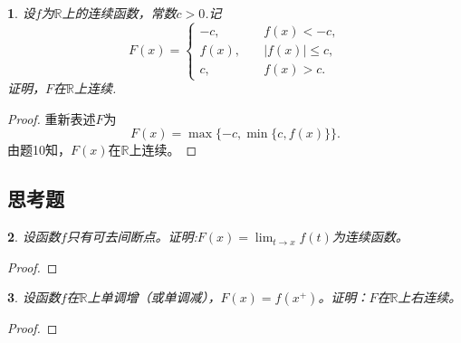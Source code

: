 \documentclass[utf8]{book}
\newtheorem{example}{}[section]             %
\begin{document}
\begin{example}
设$f$为$\mathbb{R}$上的连续函数，常数$c>0$.记
$$F(x)=
\begin{cases}
-c, \quad&f(x)<-c,\\
f(x),\quad&|f(x)| \leq c,\\
c,\quad&f(x)>c.
\end{cases}
$$
证明，$F$在$\mathbb{R}$上连续.
\end{example}
\begin{proof}重新表述$F$为
$$F(x) = \max\{-c, \min\{c, f(x)\}\}.$$由题10知，$F(x)$在$\mathbb{R}$上连续。
\end{proof}
\subsection{思考题}
\begin{example}
设函数$f$只有可去间断点。证明:$F(x)=\displaystyle\lim_{t\to x}f(t)$为连续函数。
\end{example}
\begin{proof}
\end{proof}
\begin{example}
设函数$f$在$\mathbb{R}$上单调增（或单调减），$F(x)=f(x^+)$。证明：$F$在$\mathbb{R}$上右连续。
\end{example}
\begin{proof}
\end{proof}
\end{document}
